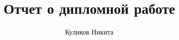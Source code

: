 \documentclass[a4paper, 14pt, russian]{extreport}
\title{Отчет о дипломной работе}
\author{Куликов Никита}
\date{}
\begin{document}
    

    

    \cite[NLOpt]{Nlopt cite}

    

    

    

    

     

    
\end{document}
